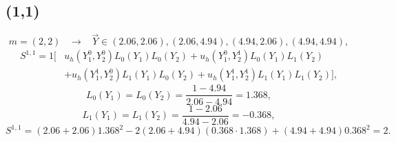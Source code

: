 \documentclass[11pt]{article}
\begin{document}
\subsection{(1,1)}
\begin{equation}
m=(2,2) \hspace{10pt} \to \hspace{10pt} \vec Y\in (2.06,2.06),(2.06,4.94),(4.94,2.06),(4.94,4.94),
\end{equation}
\begin{align}
S^{1,1}=1\Big[&u_h(Y_1^0,Y_2^0)L_0(Y_1)L_0(Y_2) + u_h(Y_1^0,Y_2^1)L_0(Y_1)L_1(Y_2)\nonumber \\
 &+ u_h(Y_1^1,Y_2^0)L_1(Y_1)L_0(Y_2) + u_h(Y_1^1,Y_2^1)L_1(Y_1)L_1(Y_2) \Big],
\end{align}
\begin{equation}
L_0(Y_1)=L_0(Y_2)=\frac{1-4.94}{2.06-4.94}=1.368,
\end{equation}
\begin{equation}
L_1(Y_1)=L_1(Y_2)=\frac{1-2.06}{4.94-2.06}=-0.368,
\end{equation}
\begin{equation}
S^{1,1}=(2.06+2.06)1.368^2 - 2(2.06+4.94)(0.368\cdot1.368) + (4.94+4.94)0.368^2 = 2.
\end{equation}
\end{document}
